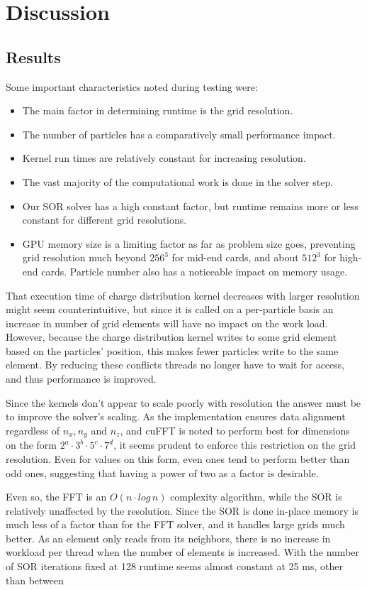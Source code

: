 \chapter{Discussion}
\section{Results}
Some important characteristics noted during testing were:
\begin{itemize}
	\item The main factor in determining runtime is the grid resolution.
	\item The number of particles has a comparatively small performance impact.
	\item Kernel run times are relatively constant for increasing resolution.
	\item The vast majority of the computational work is done in the solver step.
	\item Our SOR solver has a high constant factor, but runtime remains more or less constant for different grid resolutions.
	\item GPU memory size is a limiting factor as far as problem size goes, preventing grid resolution much beyond $256^3$ for
	mid-end cards, and about $512^3$ for high-end cards. Particle number also has a noticeable impact on memory usage.
\end{itemize}

That execution time of charge distribution kernel decreases with larger resolution might seem counterintuitive, but since it is
called on a per-particle basis an increase in number of grid elements will have no impact on the work load. However,
because the charge distribution kernel writes to some grid element based on the particles' position, this makes fewer
particles write to the same element. By reducing these conflicts threads no longer have to wait for access, and thus
performance is improved.

Since the kernels don't appear to scale poorly with resolution the answer must be to improve the solver's scaling. As
the implementation ensures data alignment regardless of $n_x, n_y$ and $n_z$, and cuFFT is noted to perform best for
dimensions on the form $2^a \cdot 3^b \cdot 5^c \cdot 7^d$, it seems prudent to enforce this restriction on the grid
resolution. Even for values on this form, even ones tend to perform better than odd ones, suggesting that having a power
of two as a factor is desirable.

Even so, the FFT is an $O(n\cdot log\,n)$ complexity algorithm, while the SOR is relatively unaffected by the
resolution. Since the SOR is done in-place memory is much less of a factor than for the FFT solver, and it handles large grids
much better. As an element only reads from its neighbors, there is no increase in workload per thread when the number of
elements is increased. With the number of SOR iterations fixed at 128 runtime seems almost constant at 25 ms, other than
between

